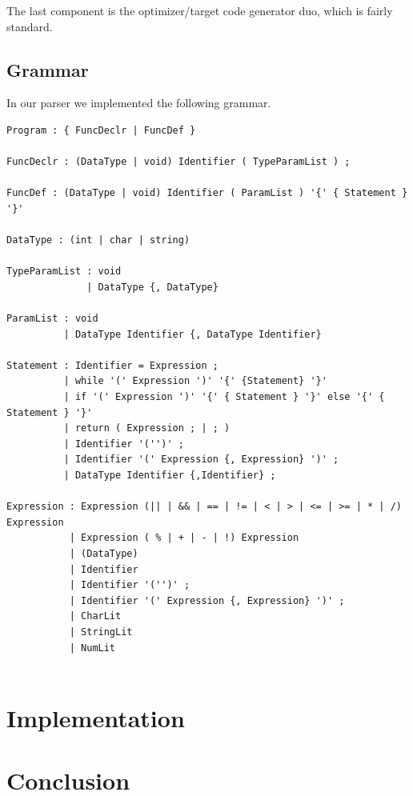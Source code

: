 \documentclass[titlepage]{article}
\begin{document}
The last component is the optimizer/target code generator duo, which is fairly standard.

\subsection{Grammar}
In our parser we implemented the following grammar.

\begin{verbatim}
Program : { FuncDeclr | FuncDef }

FuncDeclr : (DataType | void) Identifier ( TypeParamList ) ;

FuncDef : (DataType | void) Identifier ( ParamList ) '{' { Statement } '}'

DataType : (int | char | string)

TypeParamList : void
			  | DataType {, DataType}
			  
ParamList : void
		  | DataType Identifier {, DataType Identifier}
		  
Statement : Identifier = Expression ;
	      | while '(' Expression ')' '{' {Statement} '}'
	   	  | if '(' Expression ')' '{' { Statement } '}' else '{' { Statement } '}'
	   	  | return ( Expression ; | ; )
	   	  | Identifier '('')' ;
	   	  | Identifier '(' Expression {, Expression} ')' ;
	   	  | DataType Identifier {,Identifier} ;
        
Expression : Expression (|| | && | == | != | < | > | <= | >= | * | /) Expression
           | Expression ( % | + | - | !) Expression
           | (DataType)
           | Identifier
           | Identifier '('')' ;
           | Identifier '(' Expression {, Expression} ')' ;
           | CharLit
           | StringLit
           | NumLit
           
\end{verbatim}


\section{Implementation}
\label{sec:implementation}


\section{Conclusion}
\newpage


\end{document}

